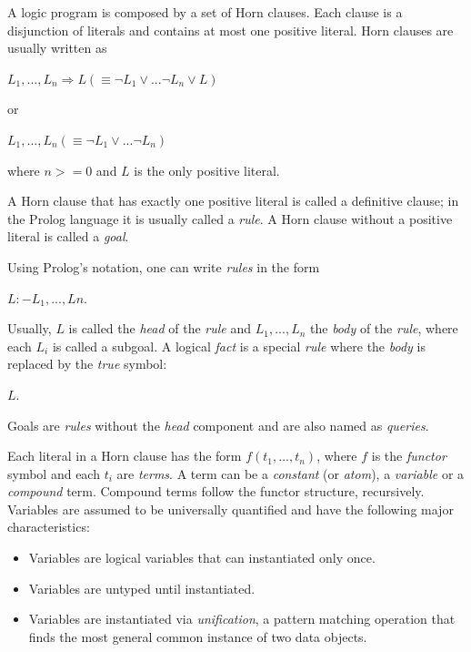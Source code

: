 A logic program is composed by a set of Horn clauses. Each clause is a disjunction of literals
and contains at most one positive literal. Horn clauses are usually written as

\begin{center}
  $L_{1}, ..., L_{n} \Longrightarrow L  (\equiv \neg L_{1} \vee ... \neg L_{n} \vee L)$
\end{center}

or

\begin{center}
  $L_{1}, ..., L_{n}  (\equiv \neg L_{1} \vee ... \neg L_{n})$
\end{center}

where $n >= 0$ and $L$ is the only positive literal. 

A Horn clause that has exactly one positive literal is called a definitive clause; in the Prolog language
it is usually called a \textit{rule}.
A Horn clause without a positive literal is called a \textit{goal}.

Using Prolog's notation, one can write \textit{rules} in the form

\begin{center}
  $L :- L_{1}, ..., L{n}.$
\end{center}

Usually, $L$ is called the \textit{head} of the \textit{rule} and $L_{1}, ..., L_{n}$
the \textit{body} of the \textit{rule}, where each $L_{i}$ is called a subgoal.
A logical \textit{fact} is a special \textit{rule} where the \textit{body} is replaced by the \textit{true} symbol:

\begin{center}
  $L.$
\end{center}

Goals are \textit{rules} without the \textit{head} component and are also named as \textit{queries}.


Each literal in a Horn clause has the form $f(t_{1}, ..., t_{n})$, where $f$ is the \textit{functor} symbol
and each $t_{i}$ are \textit{terms}. A term can be a \textit{constant} (or \textit{atom}), a \textit{variable}
or a \textit{compound} term. Compound terms follow the functor structure, recursively.
Variables are assumed to be universally quantified and have the following major characteristics:

\begin{itemize}
  \item Variables are logical variables that can instantiated only once.
  \item Variables are untyped until instantiated.
  \item Variables are instantiated via \textit{unification}, a pattern matching operation that finds the most general common instance of two data objects. 
\end{itemize}

